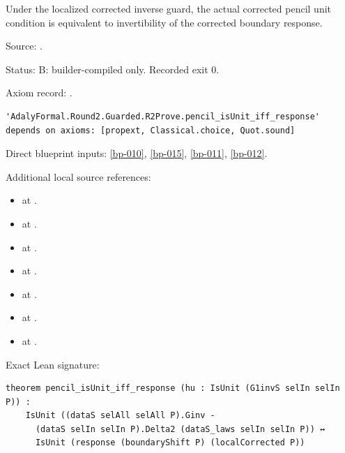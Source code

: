 \begin{theorem}[bp-017]
\label{bp-017}
\leanok
Under the localized corrected inverse guard, the actual corrected pencil unit condition is equivalent to invertibility of the corrected boundary response.

\par Source: \texttt{}.
\par Status: B: builder-compiled only. Recorded exit 0.
\par Axiom record: \texttt{}.
\begin{verbatim}
'AdalyFormal.Round2.Guarded.R2Prove.pencil_isUnit_iff_response' depends on axioms: [propext, Classical.choice, Quot.sound]
\end{verbatim}
\par Direct blueprint inputs: \ref{bp-010}, \ref{bp-015}, \ref{bp-011}, \ref{bp-012}.
\par Additional local source references:
\begin{itemize}
\item \texttt{} at \texttt{}.
\item \texttt{} at \texttt{}.
\item \texttt{} at \texttt{}.
\item \texttt{} at \texttt{}.
\item \texttt{} at \texttt{}.
\item \texttt{} at \texttt{}.
\item \texttt{} at \texttt{}.
\end{itemize}
\par Exact Lean signature:
\begin{verbatim}
theorem pencil_isUnit_iff_response (hu : IsUnit (G1invS selIn selIn P)) :
    IsUnit ((dataS selAll selAll P).Ginv -
      (dataS selIn selIn P).Delta2 (dataS_laws selIn selIn P)) ↔
      IsUnit (response (boundaryShift P) (localCorrected P))
\end{verbatim}
\end{theorem}

